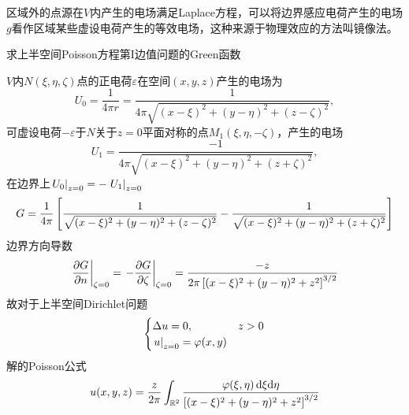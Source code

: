 区域外的点源在$V$内产生的电场满足Laplace方程，可以将边界感应电荷产生的电场$g$看作区域某些虚设电荷产生的等效电场，这种来源于物理效应的方法叫镜像法。%

\eg[1] 求上半空间Poisson方程第I边值问题的Green函数

$V$内$N(\xi,\eta,\zeta)$点的正电荷$\varepsilon$在空间$(x,y,z)$产生的电场为
\[U_0=\frac1{4\pi r}=\frac1{4\pi\sqrt{(x-\xi)^2+(y-\eta)^2+(z-\zeta)^2}},\]
可虚设电荷$-\varepsilon$于$N$关于$z=0$平面对称的点$M_1(\xi,\eta,-\zeta)$，产生的电场
\[U_1=\frac{-1}{4\pi\sqrt{(x-\xi)^2+(y-\eta)^2+(z+\zeta)^2}},\]
在边界上$\left.U_0\right\rvert_{z=0}=-\left.U_1\right\rvert_{z=0}$
{\small\[G=\frac1{4\pi}\left[\frac1{\sqrt{(x-\xi)^2+(y-\eta)^2+(z-\zeta)^2}}-\frac1{\sqrt{(x-\xi)^2+(y-\eta)^2+(z+\zeta)^2}}\right]\]}
边界方向导数
\[\edg{\pv Gn}_{\zeta=0}=\edg{-\pv G\zeta}_{\zeta=0}=\frac{-z}{2\pi\fkh{(x-\xi)^2+(y-\eta)^2+z^2}^{3/2}}\]
故对于上半空间Dirichlet问题
\[\begin{cases}
	\Delta u=0,&z>0\\
	\left.u\right\rvert_{z=0}=\varphi(x,y)
\end{cases}\]
解的Poisson公式
\[u(x,y,z)=\frac z{2\pi}\int_{\mathbb R^2}\frac{\varphi(\xi,\eta)\mathop{}\!\mathrm{d}\xi\mathrm{d}\eta}{\left[(x-\xi)^2+(y-\eta)^2+z^2\right]^{3/2}}\]

